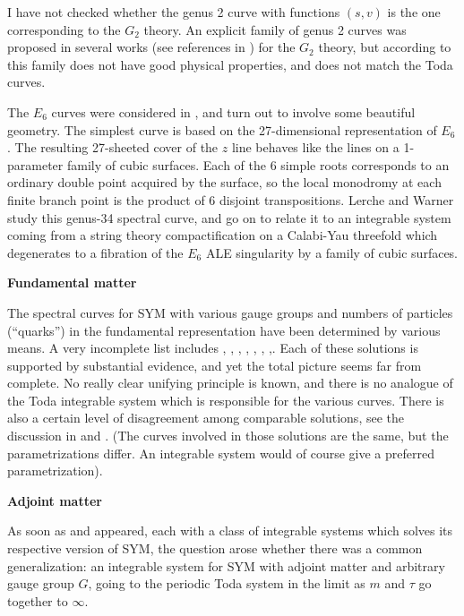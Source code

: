 I have not checked whether the genus 2 
curve with functions $(s,v)$ is the one 
corresponding to the $G_2$ theory.  An 
explicit family of genus 2 curves was
proposed in several works (see references 
in \cite{AAG}) for the $G_2$ theory,
but according to \cite{LPG} this family 
does not have good physical properties,
and does not match the Toda curves.

The $E_6$ curves were considered in 
\cite{LW}, and turn out to involve some
beautiful geometry.  The simplest curve 
is based on the 27-dimensional
representation of $E_6$.  The resulting 
27-sheeted cover of the $z$ line behaves
like the lines on a 1-parameter family of 
cubic surfaces.  Each of the 6 simple
roots corresponds to an ordinary double 
point acquired by the surface, so the
local monodromy at each finite branch 
point is the product of 6 disjoint
transpositions.  Lerche and Warner study 
this genus-34 spectral curve, and go on
to relate it to an integrable system coming 
from a string theory compactification on a
Calabi-Yau threefold which degenerates to a 
fibration of the $E_6$ ALE
singularity by a family of cubic surfaces.

\medskip\noindent
{\bf Fundamental matter}

The spectral curves for SYM with various 
gauge groups and numbers of particles
(``quarks'') in the fundamental representation 
have been determined by various
means.  A very incomplete list 
includes \cite{HO}, \cite{APS}, \cite{AS},
\cite{H}, \cite{MN}, \cite{KP}, \cite{DKP1},\cite{DKP2}. 
 Each of these solutions
is supported by substantial evidence, and yet 
the total picture seems far from
complete.  No really clear unifying principle 
is known, and there is no analogue
of the Toda integrable system which is 
responsible for the various curves.  There
is also a certain level of disagreement 
among comparable solutions, see the
discussion in \cite{MN} and \cite{DKP1}.  
(The curves involved in those solutions
are the same, but the parametrizations differ. 
An integrable system would of
course give a preferred parametrization).

\medskip\noindent
{\bf Adjoint matter}

As soon as \cite{MW} and \cite{DW} appeared, 
each with a class of integrable
systems which solves its respective 
version of SYM, the question arose whether
there was a common generalization:  
an integrable system for SYM with adjoint
matter and arbitrary gauge group $G$, 
going to the periodic Toda system in the
limit as $m$ and $\tau$ go together to $\infty$.

